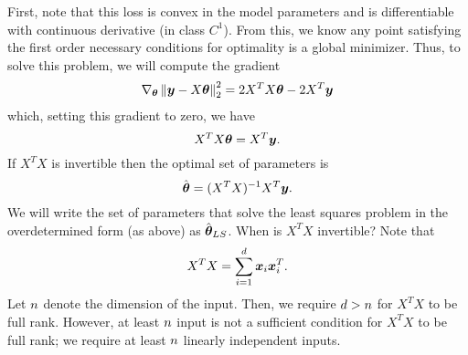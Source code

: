 First, note that this loss is convex in the model parameters and is differentiable with continuous derivative (in class $C^1$). From this, we know any point satisfying the first order necessary conditions for optimality is a global minimizer. Thus, to solve this problem, we will compute the gradient 
\begin{align}
    \nabla_{\bm{\theta}}\left\| \bm{y} - X \bm{\theta} \right\|_2^2 = 2X^T X \bm{\theta} - 2 X^T \bm{y}
    \label{eq:LS_grad}
\end{align}
which, setting this gradient to zero, we have 
\begin{equation}
    X^T X \bm{\theta} = X^T \bm{y}.
    \label{eq:LS_grad2}
\end{equation}
If $X^T X$ is invertible then the optimal set of parameters is 
\begin{equation}
    \hat{\bm{\theta}} = (X^T X)^{-1} X^T \bm{y}.
\end{equation}
We will write the set of parameters that solve the least squares problem in the overdetermined form (as above) as $\hat{\bm{\theta}}_{LS}$. When is $X^T X$ invertible? Note that
\begin{equation}
    X^T X = \sum_{i=1}^{d} \bm{x}_i \bm{x}_i^T.
\end{equation}
Let $n$ denote the dimension of the input. Then, we require $d > n$ for $X^T X$ to be full rank. However, at least $n$ input is not a sufficient condition for $X^T X$ to be full rank; we require at least $n$ linearly independent inputs. 

